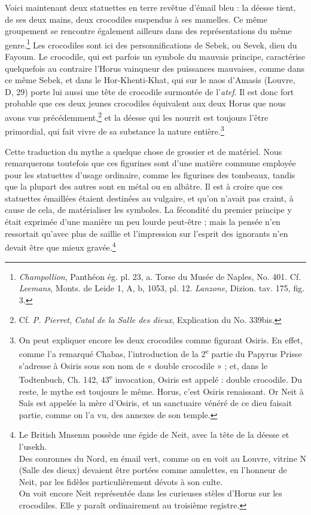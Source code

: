 \documentclass[a4paper, 11pt, oneside]{article}
\begin{document}
Voici maintenant deux statuettes en terre revêtue d'émail bleu : la déesse tient, de ses deux mains, deux crocodiles suspendus à ses mamelles. Ce même groupement se rencontre également ailleurs dans des représentations du même genre.\footnote{\emph{Champollion}, Panthéon ég. pl. 23, a. Torse du Musée de Naples, No. 401. Cf. \emph{Leemans}, Monts. de Leide 1, A, b, 1053, pl. 12. \emph{Lanzone}, Dizion. tav. 175, fig. 3.} Les crocodiles sont ici des personnifications de Sebek, ou Sevek, dieu du Fayoum. Le crocodile, qui est parfois un symbole du mauvais principe, caractérise quelquefois au contraire l'Horus vainqueur des puissances mauvaises, comme dans ce même Sebek, et dans le Hor-Khenti-Khat, qui sur le naos d'Amasis (Louvre, D, 29) porte lui aussi une tête de crocodile surmontée de l'\emph{atef}. Il est donc fort probable que ces deux jeunes crocodiles équivalent aux deux Horus que nous avons vus précédemment,\footnote{Cf. \emph{P. Pierret}, \emph{Catal de la Salle des dieux}, Explication du No. 339bis.} et la déesse qui les nourrit est toujours l'être primordial, qui fait vivre de sa substance la nature entière.\footnote{On peut expliquer encore les deux crocodiles comme figurant Osiris. En effet, comme l'a remarqué Chabas, l'introduction de la 2\textsuperscript{e} partie du Papyrus Prisse s'adresse à Osiris sous son nom de « double crocodile » ; et, dans le Todtenbuch, Ch. 142, 43\textsuperscript{e} invocation, Osiris est appelé : double crocodile. Du reste, le mythe est toujours le même. Horus, c'est Osiris renaissant. Or Neit à Saïs est appelée la mère d'Osiris, et un sanctuaire vénéré de ce dieu faisait partie, comme on l'a vu, des annexes de son temple.}

Cette traduction du mythe a quelque chose de grossier et de matériel. Nous remarquerons toutefois que ces figurines sont d'une matière commune employée pour les statuettes d'usage ordinaire, comme les figurines des tombeaux, tandis que la plupart des autres sont en métal ou en albâtre. Il est à croire que ces statuettes émaillées étaient destinées au vulgaire, et qu'on n'avait pas craint, à cause de cela, de matérialiser les symboles. La fécondité du premier principe y était exprimée d'une manière un peu lourde peut-être ; mais la pensée n'en ressortait qu'avec plus de saillie et l'impression sur l'esprit des ignorants n'en devait être que mieux gravée.\footnote{Le British Mnsenm possède une égide de Neit, avec la tête de la déesse et l'usekh.\\\hspace*{5mm}Des couronnes du Nord, en émail vert, comme on en voit au Louvre, vitrine N (Salle des dieux) devaient être portées comme amulettes, en l'honneur de Neit, par les fidèles particulièrement dévots à son culte.\\\hspace*{5mm}On voit encore Neit représentée dans les curieuses stèles d'Horus sur les crocodiles. Elle y paraît ordinairement au troisième registre.}
\end{document}
